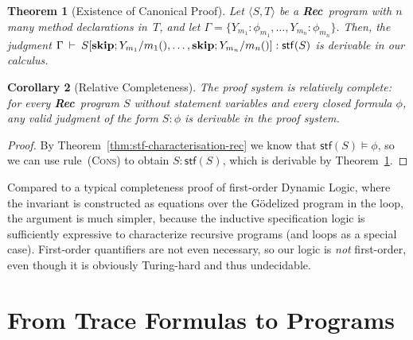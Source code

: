\documentclass[10pt,a4paper]{amsart}
\newtheorem{theorem}{Theorem}[section]
\newtheorem{corollary}[theorem]{Corollary}
\theoremstyle{definition}
\newcommand{\stfs}[1]{\mathsf{stf} (#1)}
\newcommand{\stfh}[2]{\mathsf{stf}(#1, #2)}
\newcommand{\Rec}{\mbox{\bf Rec}}
\newcommand{\Skip}{\mbox{\bf skip}}
\newcommand{\judge}[2]{#1 : #2}
\newcommand{\sequent}[2]{#1 \>\vdash\> #2}
\begin{document}
\begin{theorem}[Existence of Canonical Proof]
  \label{thm:existence-rec}
  Let $\langle S, T\rangle$ be a \Rec\ program with $n$ many method
  declarations in~$T$, and let
  $
    \Gamma=\{\judge{Y_{m_1}}{\phi_{m_1}},\ldots,\judge{Y_{m_n}}{\phi_{m_n}}\}.
  $
  Then, the judgment
  $
    \sequent{\Gamma}{\judge{S[\Skip;Y_{m_1}/m_1(),\ldots,\Skip;Y_{m_n}/m_n()]}{\stfs{S}}}
  $
  is derivable in our calculus. %
\end{theorem}

\begin{corollary}[Relative Completeness]
  \label{cor:relative-completeness-rec}
  The proof system is relatively complete: for every \Rec\ program $S$
  without statement variables and every closed formula $\phi$, any
  valid judgment of the form $\judge{S}{\phi}$ is derivable in the
  proof system.
\end{corollary}

\begin{proof}
  By Theorem~\ref{thm:stf-characterisation-rec} we know that
  $\stfs{S}\models\phi$, so we can use rule~(\textsc{Cons}) to obtain
  $\judge{S}{\stfs{S}}$, which is derivable by
  Theorem~\ref{thm:existence-rec}. %
\end{proof}


Compared to a typical completeness proof of first-order Dynamic Logic,
where the invariant is constructed as equations over the G\"{o}delized
program in the loop, the argument is much simpler, because the
inductive specification logic is sufficiently expressive to
characterize recursive programs (and loops as a special case).
%
First-order quantifiers are not even necessary, so our logic
is \emph{not} first-order, even though it is obviously Turing-hard and
thus undecidable.


\section{From Trace Formulas to Programs}
\label{sec:canonical-programs}
\end{document}
